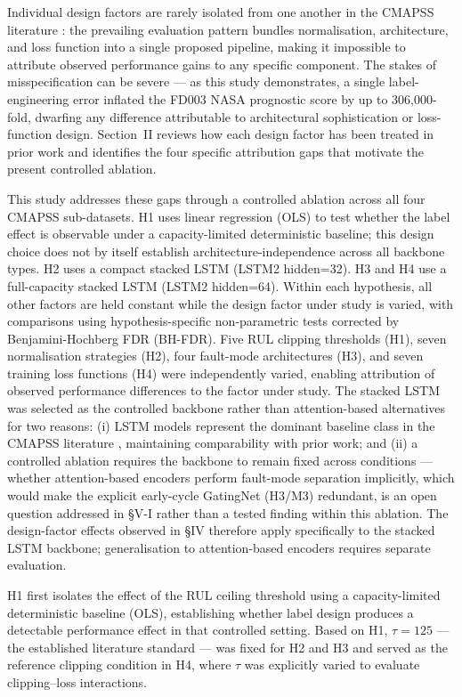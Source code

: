 \documentclass[preprint,10pt]{elsarticle}
\begin{document}
Individual design factors are rarely isolated from one another in the CMAPSS literature \cite{ref03,ref17}: the prevailing evaluation pattern bundles normalisation, architecture, and loss function into a single proposed pipeline, making it impossible to attribute observed performance gains to any specific component. The stakes of misspecification can be severe --- as this study demonstrates, a single label-engineering error inflated the FD003 NASA prognostic score by up to 306,000-fold, dwarfing any difference attributable to architectural sophistication or loss-function design. Section~II reviews how each design factor has been treated in prior work and identifies the four specific attribution gaps that motivate the present controlled ablation.

This study addresses these gaps through a controlled ablation across all four CMAPSS sub-datasets. H1 uses linear regression (OLS) to test whether the label effect is observable under a capacity-limited deterministic baseline; this design choice does not by itself establish architecture-independence across all backbone types. H2 uses a compact stacked LSTM (LSTM2 hidden=32). H3 and H4 use a full-capacity stacked LSTM (LSTM2 hidden=64). Within each hypothesis, all other factors are held constant while the design factor under study is varied, with comparisons using hypothesis-specific non-parametric tests corrected by Benjamini-Hochberg FDR (BH-FDR). Five RUL clipping thresholds (H1), seven normalisation strategies (H2), four fault-mode architectures (H3), and seven training loss functions (H4) were independently varied, enabling attribution of observed performance differences to the factor under study. The stacked LSTM was selected as the controlled backbone rather than attention-based alternatives for two reasons: (i) LSTM models represent the dominant baseline class in the CMAPSS literature \cite{ref05,ref06,ref09}, maintaining comparability with prior work; and (ii) a controlled ablation requires the backbone to remain fixed across conditions --- whether attention-based encoders perform fault-mode separation implicitly, which would make the explicit early-cycle GatingNet (H3/M3) redundant, is an open question addressed in \S{}V-I rather than a tested finding within this ablation. The design-factor effects observed in \S{}IV therefore apply specifically to the stacked LSTM backbone; generalisation to attention-based encoders requires separate evaluation.

H1 first isolates the effect of the RUL ceiling threshold using a capacity-limited deterministic baseline (OLS), establishing whether label design produces a detectable performance effect in that controlled setting. Based on H1, $\tau = 125$ --- the established literature standard \cite{ref05,ref06} --- was fixed for H2 and H3 and served as the reference clipping condition in H4, where $\tau$ was explicitly varied to evaluate clipping--loss interactions.
\end{document}
